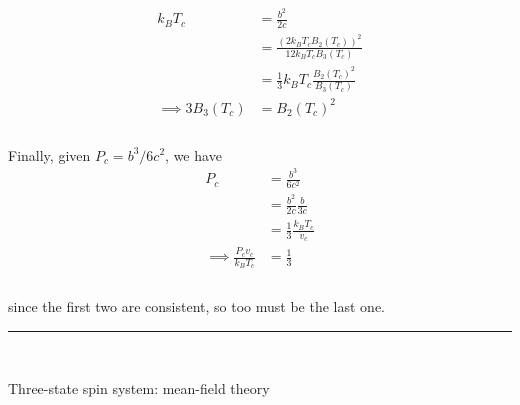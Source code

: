 \documentclass[]{article}
\begin{document}
\begin{enumerate}[1.]
\begin{enumerate}[i.]
\begin{equation}
\begin{aligned}
k_B T_c & = \frac{  b^2  }{  2c  } \\
%
& = \frac{  ( 2 k_B T_c  B_2 ( T_c ) )^2  }{  12 k_B T_c B_3 ( T_c ) } \\
%
& = \frac{ 1}{3} k_B T_c \frac{ B_2 ( T_c )^2 }{ B_3 ( T_c ) } \\
%
\implies 3 B_3 (T_c ) & = B_2 ( T_c )^2 \\
\end{aligned}
\end{equation} \\

Finally, given $P_c = b^3 / 6 c^2 $, we have \\

\begin{equation}
\begin{aligned}
P_c & = \frac{ b^3 }{ 6 c^2 } \\
%
& =  \frac{ b^2 }{ 2 c } \frac{ b }{ 3 c} \\
%
& = \frac{ 1 }{3 } \frac{  k_B T_c }{ v_c } \\
\implies \frac{ P_c v_c }{ k_B T_c } & = \frac{ 1 }{3 } \\
\end{aligned}
\end{equation} \\

since the first two are consistent, so too must be the last one. \\



\end{enumerate}































\noindent\rule{15cm}{0.4pt} \\





{\bf \item Three-state spin system: mean-field theory} \\


\end{enumerate}
\end{document}
